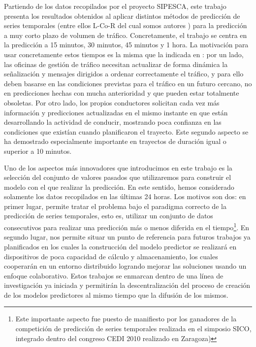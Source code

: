 \documentclass[twocolumn]{maeb2015}
\begin{document}
Partiendo de los datos recopilados por el proyecto SIPESCA, este trabajo presenta los resultados obtenidos al aplicar distintos métodos de predicción de series temporales (entre ellos {L-Co-R} del cual somos autores \cite{LCOR}) para la predicción a muy corto plazo de volumen de tráfico. Concretamente, el trabajo se centra en la predicción a 15 minutos, 30 minutos, 45 minutos y 1 hora. La motivación para usar concretamente estos tiempos es la misma que la indicada en \cite{Min2011606}: por un lado, las oficinas de gestión de tráfico necesitan actualizar de forma dinámica la señalización y mensajes dirigidos a ordenar correctamente el tráfico, y para ello deben basarse en las condiciones previstas para el tráfico en un futuro cercano, no en predicciones hechas con mucha anterioridad y que pueden estar totalmente obsoletas. Por otro lado, los propios conductores solicitan cada vez más información y predicciones actualizadas en el mismo instante en que están desarrollando la actividad de conducir, mostrando poca confianza en las condiciones que existían cuando planificaron el trayecto. Este segundo aspecto se ha demostrado especialmente importante en trayectos de duración igual o superior a 10 minutos.

Uno de los aspectos más innovadores que introducimos en este trabajo es la selección del conjunto de valores pasados que utilizaremos para construir el modelo con el que realizar la predicción. En este sentido, hemos considerado solamente los datos recopilados en las últimas 24 horas. Los motivos son dos: en primer lugar, permite tratar el problema bajo el paradigma correcto de la predicción de series temporales, esto es, utilizar un conjunto de datos consecutivos para realizar una predicción más o menos diferida en el tiempo\footnote{Este importante aspecto fue puesto de manifiesto por los ganadores de la competición de predicción de series temporales realizada en el simposio SICO, integrado dentro del congreso CEDI 2010 realizado en Zaragoza)}. En segundo lugar, nos permite situar un punto de referencia para futuros trabajos ya planificados en los cuales la construcción del modelo predictor se realizará en dispositivos de poca capacidad de cálculo y almacenamiento, los cuales cooperarán en un entorno distribuido logrando mejorar las soluciones usando un enfoque colaborativo. Estos trabajos se enmarcan dentro de una línea de investigación ya iniciada \cite{ jsEO, nodeEO, etc.} y permitirán la descentralización del proceso de creación de los modelos predictores al mismo tiempo que la difusión de los mismos.
\end{document}
